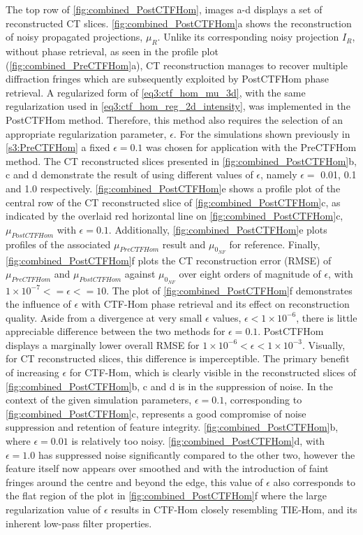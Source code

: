 \documentclass[twocolumn, switch]{article} %
\begin{document}
The top row of \cref{fig:combined_PostCTFHom}, images a-d displays a set of reconstructed CT slices. \cref{fig:combined_PostCTFHom}a shows the reconstruction of noisy propagated projections, $\mu_R$. Unlike its corresponding noisy projection $I_R$, without phase retrieval, as seen in the profile plot (\cref{fig:combined_PreCTFHom}a), CT reconstruction manages to recover multiple diffraction fringes which are subsequently exploited by PostCTFHom phase retrieval. A regularized form of \cref{eq3:ctf_hom_mu_3d}, with the same regularization used in \cref{eq3:ctf_hom_reg_2d_intensity}, was implemented in the PostCTFHom method. Therefore, this method also requires the selection of an appropriate regularization parameter, $\epsilon$. For the simulations shown previously in \cref{s3:PreCTFHom} a fixed $\epsilon=0.1$ was chosen for application with the PreCTFHom method. The CT reconstructed slices presented in \cref{fig:combined_PostCTFHom}b, c and d demonstrate the result of using different values of $\epsilon$, namely $\epsilon=$ 0.01, 0.1 and 1.0 respectively. \cref{fig:combined_PostCTFHom}e shows a profile plot of the central row of the CT reconstructed slice of \cref{fig:combined_PostCTFHom}c, as indicated by the overlaid red horizontal line on \cref{fig:combined_PostCTFHom}c, $\mu_{PostCTFHom}$ with $\epsilon=0.1$. Additionally, \cref{fig:combined_PostCTFHom}e plots profiles of the associated $\mu_{PreCTFHom}$ result and $\mu_{0_{NF}}$ for reference. Finally, \cref{fig:combined_PostCTFHom}f plots the CT reconstruction error (RMSE) of $\mu_{PreCTFHom}$ and $\mu_{PostCTFHom}$ against $\mu_{0_{NF}}$ over eight orders of magnitude of $\epsilon$, with $1 \times 10^{-7}<=\epsilon<=10$. The plot of \cref{fig:combined_PostCTFHom}f demonstrates the influence of $\epsilon$ with CTF-Hom phase retrieval and its effect on reconstruction quality. Aside from a  divergence at very small $\epsilon$ values,  $\epsilon<1\times 10^{-6}$, there is little appreciable difference between the two methods for $\epsilon=0.1$. PostCTFHom displays a marginally lower overall RMSE for $1 \times 10^{-6}<\epsilon<1 \times 10^{-3}$. Visually, for CT reconstructed slices, this difference is imperceptible. 
The primary benefit of increasing $\epsilon$ for CTF-Hom, which is clearly visible in the reconstructed slices of \cref{fig:combined_PostCTFHom}b, c and d is in the suppression of noise. In the context of the given simulation parameters, $\epsilon=0.1$, corresponding to \cref{fig:combined_PostCTFHom}c, represents a good compromise of noise suppression and retention of feature integrity. \cref{fig:combined_PostCTFHom}b, where $\epsilon=0.01$ is relatively too noisy. \cref{fig:combined_PostCTFHom}d, with $\epsilon=1.0$ has suppressed noise significantly compared to the other two, however the feature itself now appears over smoothed and with the introduction of faint fringes around the centre and beyond the edge, this value of $\epsilon$ also corresponds to the flat region of the plot in \cref{fig:combined_PostCTFHom}f where the large regularization value of $\epsilon$ results in CTF-Hom closely resembling TIE-Hom, and its inherent low-pass filter properties.
\end{document}
